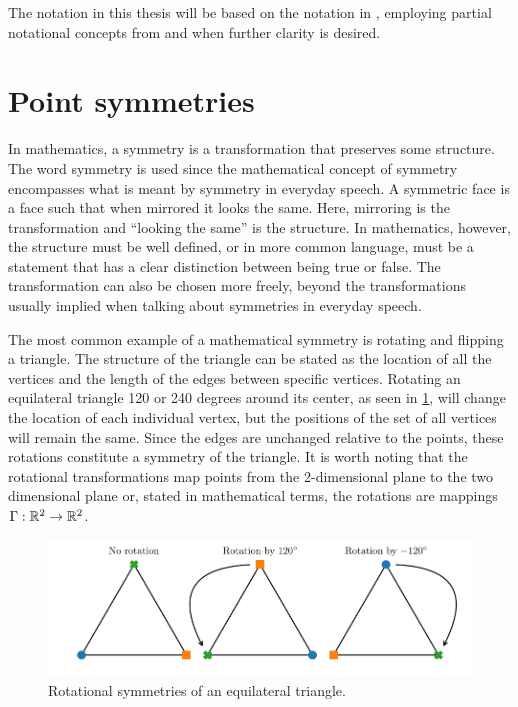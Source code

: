 The notation in this thesis will be based on the notation in \cite{hydon2000symmetry}, employing partial notational concepts from \cite{olver1995equivalence} and \cite{ovsiannikov1982group} when further clarity is desired.

\section{Point symmetries}

In mathematics, a symmetry is a transformation that preserves some structure.
The word symmetry is used since the mathematical concept of symmetry encompasses what is meant by symmetry in everyday speech.
A symmetric face is a face such that when mirrored it looks the same.
Here, mirroring is the transformation and \enquote{looking the same} is the structure.
In mathematics, however, the structure must be well defined, or in more common language, must be a statement that has a clear distinction between being true or false.
The transformation can also be chosen more freely, beyond the transformations usually implied when talking about symmetries in everyday speech.

The most common example of a mathematical symmetry is rotating and flipping a triangle.
The structure of the triangle can be stated as the location of all the vertices and the length of the edges between specific vertices.
Rotating an equilateral triangle 120 or 240 degrees around its center, as seen in \cref{fig:triangle-rotation}, will change the location of each individual vertex, but the positions of the set of all vertices will remain the same.
Since the edges are unchanged relative to the points, these rotations constitute a symmetry of the triangle.
It is worth noting that the rotational transformations map points from the 2-dimensional plane to the two dimensional plane or, stated in mathematical terms, the rotations are mappings \(\Gamma: \mathbb{R}^2 \to \mathbb{R}^2\).
\begin{figure}
  \centering
  \includegraphics[width=.96\textwidth]{images/triangles}
  \caption{Rotational symmetries of an equilateral triangle.}
  \label{fig:triangle-rotation}
\end{figure}

